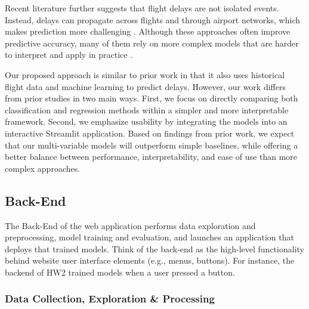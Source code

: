 Recent literature further suggests that flight delays are not isolated events. Instead, delays can propagate across flights and through airport networks, which makes prediction more challenging \cite{chen2019chained, wu2019propagation}. Although these approaches often improve predictive accuracy, many of them rely on more complex models that are harder to interpret and apply in practice \cite{zoutendijk2021probabilistic}.

Our proposed approach is similar to prior work in that it also uses historical flight data and machine learning to predict delays. However, our work differs from prior studies in two main ways. First, we focus on directly comparing both classification and regression methods within a simpler and more interpretable framework. Second, we emphasize usability by integrating the models into an interactive Streamlit application. Based on findings from prior work, we expect that our multi-variable models will outperform simple baselines, while offering a better balance between performance, interpretability, and ease of use than more complex approaches.


\subsection{Back-End}

The Back-End of the web application performs data exploration and preprocessing, model training and evaluation, and launches an application that deploys that trained models. Think of the back-end as the high-level functionality behind website user interface elements (e.g., menus, buttons). For instance, the backend of HW2 trained models when a user pressed a button.

\subsubsection{Data Collection, Exploration \& Processing} 

